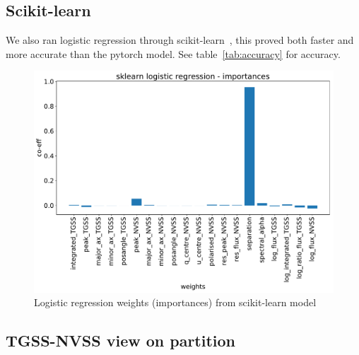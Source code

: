 \documentclass[12pt,a4paper]{article}
\begin{document}
\subsection{Scikit-learn}
\label{app:sklearn}

We also ran logistic regression through scikit-learn~\citep{sklearn}, this proved both faster and more accurate than the pytorch model. See table~\ref{tab:accuracy} for accuracy.

\begin{figure}[H]
    \centering
    \includegraphics[width=\textwidth]{pics/sklearn_lr.pdf}
    \caption{Logistic regression weights (importances) from scikit-learn model}
    \label{fig:sklearn_lr}
\end{figure}

\subsection{TGSS-NVSS view on partition}
\label{app:windows}
\end{document}
